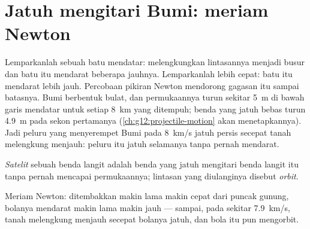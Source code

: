 \section{Jatuh mengitari Bumi: meriam Newton}

Lemparkanlah sebuah batu mendatar:  melengkungkan lintasannya
menjadi busur dan batu itu mendarat beberapa  jauhnya.
Lemparkanlah lebih cepat: batu itu mendarat lebih jauh. Percobaan
pikiran Newton mendorong gagasan itu sampai batasnya. Bumi berbentuk
bulat, dan permukaannya turun sekitar \qty{5}{m} di bawah garis mendatar
untuk setiap \qty{8}{km} yang ditempuh; benda yang jatuh bebas turun
\qty{4.9}{m} pada sekon pertamanya
(\cref{ch:g12:projectile-motion} akan menetapkannya). Jadi peluru yang
menyerempet Bumi pada \qty{8}{km/s} jatuh persis secepat tanah
melengkung menjauh: peluru itu jatuh selamanya tanpa pernah mendarat.

\begin{definition}\label{def:g10:universal-gravitation:satellite}
\emph{Satelit} sebuah benda langit adalah benda yang
jatuh mengitari benda langit itu tanpa pernah mencapai permukaannya;
lintasan yang diulanginya disebut \emph{orbit}.
\end{definition}

\begin{omfigure}

{\small Meriam Newton: ditembakkan makin lama makin cepat dari puncak
gunung, bolanya mendarat makin lama makin jauh --- sampai, pada sekitar
\qty{7.9}{km/s}, tanah melengkung menjauh secepat bolanya jatuh, dan
bola itu pun mengorbit.}
\end{omfigure}

